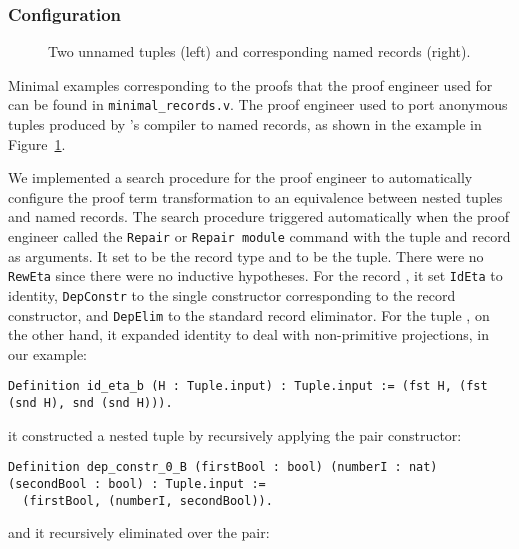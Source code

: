 
\subsubsection{Configuration}

\begin{figure}
\begin{minipage}{0.25\textwidth}
   
\end{minipage}
\hfill
\begin{minipage}{0.74\textwidth}
   
\end{minipage}
\caption{Two unnamed tuples (left) and corresponding named records (right).}
\label{fig:records}
\end{figure}

Minimal examples corresponding to the proofs that the proof engineer used \toolname for
can be found in \lstinline{minimal_records.v}.
The proof engineer used \toolname to port anonymous tuples produced by \company's compiler
to named records, as shown in the example in Figure~\ref{fig:records}.

We implemented a search procedure for the proof engineer to automatically configure the proof term transformation to an equivalence
between nested tuples and named records.
The search procedure triggered automatically when the proof engineer called the \lstinline{Repair} or \lstinline{Repair module} command
with the tuple and record as arguments.
It set \A to be the record type and \B to be the tuple.
There were no \lstinline{RewEta} since there were no inductive hypotheses.
For the record \A, it set \lstinline{IdEta} to identity, \lstinline{DepConstr} to the single
constructor corresponding to the record constructor, and \lstinline{DepElim} to the standard record eliminator.
For the tuple \B, on the other hand, it expanded identity to deal with non-primitive projections,
in our example:
\begin{lstlisting}
Definition id_eta_b (H : Tuple.input) : Tuple.input := (fst H, (fst (snd H), snd (snd H))).
\end{lstlisting}
it constructed a nested tuple by recursively applying the pair constructor:

\begin{lstlisting}
Definition dep_constr_0_B (firstBool : bool) (numberI : nat) (secondBool : bool) : Tuple.input :=
  (firstBool, (numberI, secondBool)).
\end{lstlisting}
and it recursively eliminated over the pair:

